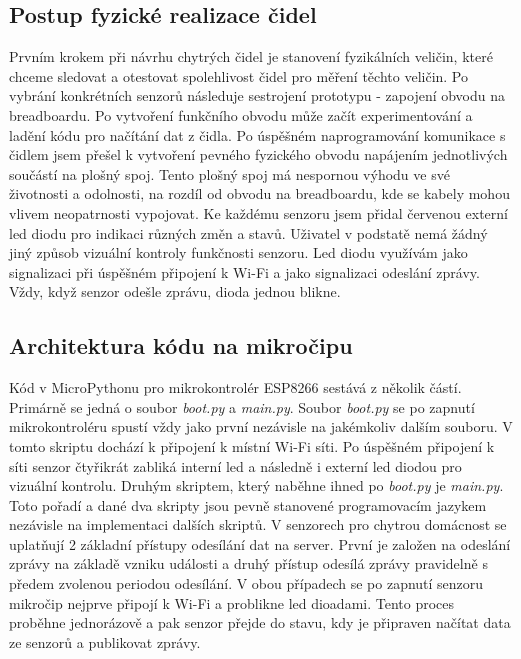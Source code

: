 \subsection*{Postup fyzické realizace čidel}
Prvním krokem při návrhu chytrých čidel je stanovení fyzikálních veličin, které chceme sledovat a otestovat spolehlivost čidel pro měření těchto veličin. Po vybrání konkrétních senzorů následuje sestrojení prototypu - zapojení obvodu na breadboardu. Po vytvoření funkčního obvodu může začít experimentování a ladění kódu pro načítání dat z čidla. Po úspěšném naprogramování komunikace s čidlem jsem přešel k vytvoření pevného fyzického obvodu napájením jednotlivých součástí na plošný spoj. Tento plošný spoj má nespornou výhodu ve své životnosti a odolnosti, na rozdíl od obvodu na breadboardu, kde se kabely mohou vlivem neopatrnosti vypojovat. Ke každému senzoru jsem přidal červenou externí led diodu pro indikaci různých změn a stavů. Uživatel v podstatě nemá žádný jiný způsob vizuální kontroly funkčnosti senzoru. Led diodu využívám jako signalizaci při úspěšném připojení k Wi-Fi a jako signalizaci odeslání zprávy. Vždy, když senzor odešle zprávu, dioda jednou blikne. 

\subsection*{Architektura kódu na mikročipu}
Kód v MicroPythonu pro mikrokontrolér ESP8266 sestává z několik částí. Primárně se jedná o soubor \textit{boot.py} a \textit{main.py}. Soubor \textit{boot.py} se po zapnutí mikrokontroléru spustí vždy jako první nezávisle na jakémkoliv dalším souboru. V tomto skriptu dochází k připojení k místní Wi-Fi síti. Po úspěšném připojení k síti senzor čtyřikrát zabliká interní led a následně i externí led diodou pro vizuální kontrolu. Druhým skriptem, který naběhne ihned po \textit{boot.py} je \textit{main.py}. Toto pořadí a dané dva skripty jsou pevně stanovené programovacím jazykem nezávisle na implementaci dalších skriptů.
V senzorech pro chytrou domácnost se uplatňují 2 základní přístupy odesílání dat na server. První je založen na odeslání zprávy na základě vzniku události a druhý přístup odesílá zprávy pravidelně s předem zvolenou periodou odesílání. V obou případech se po zapnutí senzoru mikročip nejprve připojí k Wi-Fi a problikne led dioadami. Tento proces proběhne jednorázově a pak senzor přejde do stavu, kdy je připraven načítat data ze senzorů a publikovat zprávy.

